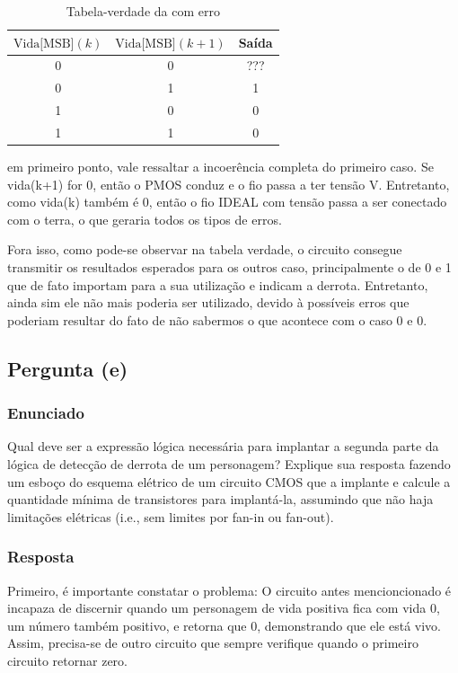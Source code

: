 \documentclass[12pt]{article}
\begin{document}
\begin{table}[H]
\caption{Tabela-verdade da com erro}
\centering
\renewcommand{\arraystretch}{1.3}
\begin{tabular}{|c|c|c|}
    \hline
    $\text{Vida[MSB]}(k)$ & $\text{Vida[MSB]}(k+1)$ & Saída \\
    \hline
    0 & 0 & ??? \\
    0 & 1 & 1 \\
    1 & 0 & 0 \\
    1 & 1 & 0 \\
\hline
\end{tabular}
\end{table}

em primeiro ponto, vale ressaltar a incoerência completa do primeiro caso. Se vida(k+1) for 0, então o PMOS conduz e o fio passa a ter tensão V. Entretanto, como vida(k) também é 0, então o fio IDEAL com tensão passa a ser conectado com o terra, o que geraria todos os tipos de erros.

Fora isso, como pode-se observar na tabela verdade, o circuito consegue transmitir os resultados esperados para os outros caso, principalmente o de 0 e 1 que de fato importam para a sua utilização e indicam a derrota. Entretanto, ainda sim ele não mais poderia ser utilizado, devido à possíveis erros que poderiam resultar do fato de não sabermos o que acontece com o caso 0 e 0. 

\subsection{Pergunta (e)}

\subsubsection*{Enunciado}
Qual deve ser a expressão lógica necessária para implantar a segunda parte da lógica de detecção de derrota de um personagem? Explique sua resposta fazendo um esboço do esquema elétrico de um circuito CMOS que a implante e calcule a quantidade mínima de transistores para implantá-la, assumindo que não haja limitações elétricas (i.e., sem limites por fan-in ou fan-out).

\subsubsection*{Resposta}

Primeiro, é importante constatar o problema: O circuito antes mencioncionado é incapaza de discernir quando um personagem de vida positiva fica com vida 0, um número também positivo, e retorna que 0, demonstrando que ele está vivo. Assim, precisa-se de outro circuito que sempre verifique quando o primeiro circuito retornar zero.
\end{document}

